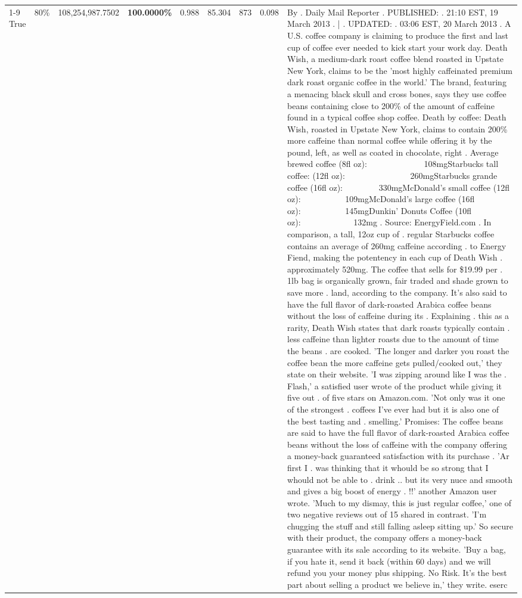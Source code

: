 \begin{table}[H]
{\begin{tabular}{lllrlllll}
\cline{1-9} \cline{2-9}
True & 80\% & 108,254,987.7502 & \bfseries \color{red} 100.0000\% & 0.988 & 85.304 & 873 & 0.098 & By . Daily Mail Reporter . PUBLISHED: . 21:10 EST, 19 March 2013 . | . UPDATED: . 03:06 EST, 20 March 2013 . A U.S. coffee company is claiming to produce the first and last cup of coffee ever needed to kick start your work day. Death Wish, a medium-dark roast coffee blend roasted in Upstate New York, claims to be the 'most highly caffeinated premium dark roast organic coffee in the world.' The brand, featuring a menacing black skull and cross bones, says they use coffee beans containing close to 200\% of the amount of caffeine found in a typical coffee shop coffee. Death by coffee: Death Wish, roasted in Upstate New York, claims to contain 200\% more caffeine than normal coffee while offering it by the pound, left, as well as coated in chocolate, right . Average brewed coffee (8fl oz):              108mgStarbucks tall coffee: (12fl oz):                260mgStarbucks grande coffee (16fl oz):         330mgMcDonald's small coffee (12fl oz):           109mgMcDonald's large coffee (16fl oz):           145mgDunkin' Donuts Coffee (10fl oz):             132mg . Source: EnergyField.com . In comparison, a tall, 12oz cup of . regular Starbucks coffee contains an average of 260mg caffeine according . to Energy Fiend, making the potentency in each cup of Death Wish . approximately 520mg. The coffee that sells for \$19.99 per . 1lb bag is organically grown, fair traded and shade grown to save more . land, according to the company. It's also said to have the full flavor of dark-roasted Arabica coffee beans without the loss of caffeine during its . Explaining . this as a rarity, Death Wish states that dark roasts typically contain . less caffeine than lighter roasts due to the amount of time the beans . are cooked. 'The longer and darker you roast the coffee bean the more caffeine gets pulled/cooked out,' they state on their website. 'I was zipping around like I was the . Flash,' a satisfied user wrote of the product while giving it five out . of five stars on Amazon.com. 'Not only was it one of the strongest . coffees I've ever had but it is also one of the best tasting and . smelling.’ Promises: The coffee beans are said to have the full flavor of dark-roasted Arabica coffee beans without the loss of caffeine with the company offering a money-back guaranteed satisfaction with its purchase . 'Ar first I . was thinking that it whould be so strong that I whould not be able to . drink .. but its very nuce and smooth and gives a big boost of energy . !!' another Amazon user wrote. 'Much to my dismay, this is just regular coffee,' one of two negative reviews out of 15 shared in contrast. 'I'm chugging the stuff and still falling asleep sitting up.' So secure with their product, the company offers a money-back guarantee with its sale according to its website. 'Buy a bag, if you hate it, send it back (within 60 days) and we will refund you your money plus shipping. No Risk. It’s the best part about selling a product we believe in,' they write. eserc \\

\end{tabular}}
\end{table}
